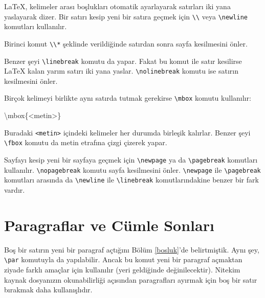 \documentclass[
  10pt,
]{scrbook}
\newenvironment{Shaded}{\begin{snugshade}}{\end{snugshade}}
\newcommand{\FunctionTok}[1]{\textcolor[rgb]{0.00,0.00,0.00}{#1}}
\newcommand{\NormalTok}[1]{#1}
\theoremstyle{definition}
\theoremstyle{definition}
\theoremstyle{definition}
\theoremstyle{definition}
\theoremstyle{remark}
\begin{document}
LaTeX, kelimeler arası boşlukları otomatik ayarlayarak satırları iki yana yaslayarak dizer. Bir satırı kesip yeni bir satıra geçmek için \texttt{\textbackslash{}\textbackslash{}} veya \texttt{\textbackslash{}newline} komutları kullanılır.

Birinci komut \texttt{\textbackslash{}\textbackslash{}*} şeklinde verildiğinde satırdan sonra sayfa kesilmesini önler.

Benzer şeyi \texttt{\textbackslash{}linebreak} komutu da yapar. Fakat bu komut ile satır kesilirse LaTeX kalan yarım satırı iki yana yaslar. \texttt{\textbackslash{}nolinebreak} komutu ise satırın kesilmesini önler.

Birçok kelimeyi birlikte aynı satırda tutmak gerekirse \texttt{\textbackslash{}mbox} komutu kullanılır:

\begin{Shaded}
\begin{Highlighting}[]
\FunctionTok{\textbackslash{}mbox}\NormalTok{\{\textless{}metin\textgreater{}\}}
\end{Highlighting}
\end{Shaded}

Buradaki \texttt{\textless{}metin\textgreater{}} içindeki kelimeler her durumda birleşik kalırlar. Benzer şeyi \texttt{\textbackslash{}fbox} komutu da metin etrafına çizgi çizerek yapar.

Sayfayı kesip yeni bir sayfaya geçmek için \texttt{\textbackslash{}newpage} ya da \texttt{\textbackslash{}pagebreak} komutları kullanılır. \texttt{\textbackslash{}nopagebreak} komutu sayfa kesilmesini önler. \texttt{\textbackslash{}newpage} ile \texttt{\textbackslash{}pagebreak} komutları arasında da \texttt{\textbackslash{}newline} ile \texttt{\textbackslash{}linebreak} komutlarındakine benzer bir fark vardır.

\hypertarget{paragraflar-ve-cuxfcmle-sonlarux131}{%
\section{Paragraflar ve Cümle Sonları}\label{paragraflar-ve-cuxfcmle-sonlarux131}}

Boş bir satırın yeni bir paragraf açtığını Bölüm \ref{bosluk}'de belirtmiştik. Aynı şey, \texttt{\textbackslash{}par} komutuyla da yapılabilir. Ancak bu komut yeni bir paragraf açmaktan ziyade farklı amaçlar için kullanılır (yeri geldiğinde değinilecektir). Nitekim kaynak dosyanızın okunabilirliği açısından paragrafları ayırmak için boş bir satır bırakmak daha kullanışlıdır.
\end{document}
